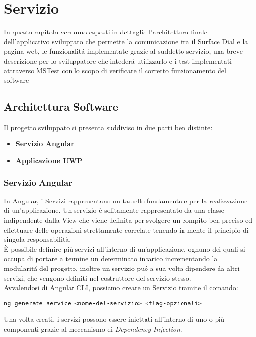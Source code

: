 
\chapter{Servizio}
\label{chap:serv}
In questo capitolo verranno esposti in dettaglio l'architettura finale dell'applicativo sviluppato che permette la comunicazione tra il Surface Dial e la pagina web, le funzionalitá implementate grazie al suddetto servizio, una breve descrizione per lo sviluppatore che intederá utilizzarlo e i test implementati attraverso MSTest con lo scopo di verificare il corretto funzionamento del software
\section{Architettura Software}
Il progetto sviluppato si presenta suddiviso in due parti ben distinte:
\begin{itemize}
\item \textbf{Servizio Angular}
\item \textbf{Applicazione UWP}
\end{itemize}

\subsection{Servizio Angular}

In Angular, i Servizi rappresentano un tassello fondamentale per la realizzazione di un'applicazione. Un servizio è solitamente rappresentato da una classe indipendente dalla View che viene definita per svolgere un compito ben preciso ed effettuare delle operazioni strettamente correlate tenendo in mente il principio di singola responsabilità.\\
È possibile definire più servizi all'interno di un'applicazione, ognuno dei quali si occupa di portare a termine un determinato incarico incrementando la modularitá del progetto, inoltre un servizio puó a sua volta dipendere da altri servizi, che vengono definiti nel costruttore del servizio stesso.\\

Avvalendosi di Angular CLI, possiamo creare un Servizio tramite il comando:

\vspace{1.0cm}
\begin{lstlisting}[caption={Esempio creazione servizio},style=javaScriptCode]
	ng generate service <nome-del-servizio> <flag-opzionali>
\end{lstlisting} 
\vspace{1.0cm}
Una volta creati, i servizi possono essere iniettati all'interno di uno o più componenti grazie al meccanismo di \emph{Dependency Injection}.\\

